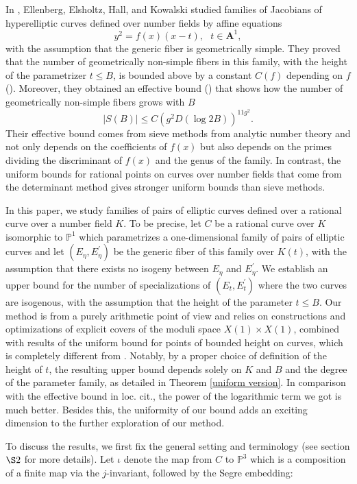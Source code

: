 \documentclass[12pt]{amsart}
\theoremstyle{definition}
\theoremstyle{remark}
\numberwithin{equation}{section}
\begin{document}
In \cite{EEHK09}, Ellenberg, Elsholtz, Hall, and Kowalski studied families of Jacobians of hyperelliptic curves defined over number fields by affine equations
$$y^{2}=f(x)(x-t), \text{     } t\in \mathbf{A}^{1},$$
 with the assumption that the generic fiber is geometrically simple. They proved that the number of geometrically non-simple fibers in this family, with the height of the parametrizer $t \le B$, is bounded above by a constant $C(f)$ depending on $f$ (\cite[Theorem A]{EEHK09}). Moreover, they obtained an effective bound (\cite[Theorem B]{EEHK09}) that shows how the number of geometrically non-simple fibers grows with $B$
 $$|S(B)| \leqslant C\left(g^2 D(\log 2 B)\right)^{11 g^2}.$$
 Their effective bound comes from sieve methods from analytic number theory and not only depends on the coefficients of $f(x)$ but also depends on the primes dividing the discriminant of $f(x)$ and the genus of the family. In contrast, the uniform bounds for rational points on curves over number fields that come from the determinant method gives stronger uniform bounds than sieve methods. 
 
In this paper, we study families of pairs of elliptic curves defined over a rational curve over a number field $K$. To be precise, let $C$ be a rational curve over $K$ isomorphic to $\mathbb{P}^{1}$ which parametrizes a one-dimensional family of pairs of elliptic curves and let $(E_{\eta}, E^{\prime}_{\eta})$ be the generic fiber of this family over $K(t)$, with the assumption that there exists no isogeny between $E_{\eta}$ and $E^{\prime}_{\eta}$. We establish an upper bound for the number of specializations of $(E_{t}, E^{\prime}_{t})$ where the two curves are isogenous, with the assumption that the height of the parameter $t \le B$. Our method is from a purely arithmetic point of view and relies on constructions and optimizations of explicit covers of the moduli space $X(1) \times X(1)$, combined with results of the uniform bound for points of bounded height on curves, which is completely different from \cite{EEHK09}. Notably, by a proper choice of definition of the height of $t$, the resulting upper bound depends solely on $K$ and $B$ and the degree of the parameter family, as detailed in Theorem \ref{uniform version}. In comparison with the effective bound in loc. cit., the power of the logarithmic term we got is much better. Besides this, the uniformity of our bound adds an exciting dimension to the further exploration of our method.

To discuss the results, we first fix the general setting and terminology (see section $\S 2$ for more details). Let $\iota$ denote the map from $C$ to $\mathbb{P}^{3}$ which is a composition of a finite map via the $j$-invariant, followed by the Segre embedding: 
\end{document}
